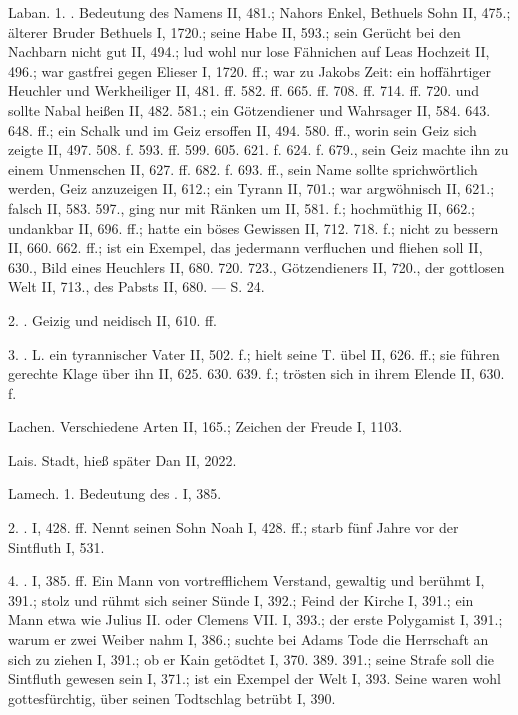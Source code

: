 Laban. 1. . Bedeutung des Namens II, 481.; Nahors Enkel, Bethuels Sohn II, 475.; älterer Bruder Bethuels I, 1720.; seine Habe II, 593.; sein Gerücht bei den Nachbarn nicht gut II, 494.; lud wohl nur lose Fähnichen auf Leas Hochzeit II, 496.; war gastfrei gegen Elieser I, 1720. ff.; war zu Jakobs Zeit: ein hoffährtiger Heuchler und Werkheiliger II, 481. ff. 582. ff. 665. ff. 708. ff. 714. ff. 720. und sollte Nabal heißen II, 482. 581.; ein Götzendiener und Wahrsager II, 584. 643. 648. ff.; ein Schalk und im Geiz ersoffen II, 494. 580. ff., worin sein Geiz sich zeigte II, 497. 508. f. 593. ff. 599. 605. 621. f. 624. f. 679., sein Geiz machte ihn zu einem Unmenschen II, 627. ff. 682. f. 693. ff., sein Name sollte sprichwörtlich werden, Geiz anzuzeigen II, 612.; ein Tyrann II, 701.; war argwöhnisch II, 621.; falsch II, 583. 597., ging nur mit Ränken um II, 581. f.; hochmüthig II, 662.; undankbar II, 696. ff.; hatte ein böses Gewissen II, 712. 718. f.; nicht zu bessern II, 660. 662. ff.; ist ein Exempel, das jedermann verfluchen und fliehen soll II, 630., Bild eines Heuchlers II, 680. 720. 723., Götzendieners II, 720., der gottlosen Welt II, 713., des Pabsts II, 680. — S.  24.

2. . Geizig und neidisch II, 610. ff.

3. . L. ein tyrannischer Vater II, 502. f.; hielt seine T. übel II, 626. ff.; sie führen gerechte Klage über ihn II, 625. 630. 639. f.; trösten sich in ihrem Elende II, 630. f.

Lachen. Verschiedene Arten II, 165.; Zeichen der Freude I, 1103.

Lais. Stadt, hieß später Dan II, 2022.

Lamech. 1. Bedeutung des . I, 385.

2. . I, 428. ff. Nennt seinen Sohn Noah I, 428. ff.; starb fünf Jahre vor der Sintfluth I, 531.

4. . I, 385. ff. Ein Mann von vortrefflichem Verstand, gewaltig und berühmt I, 391.; stolz und rühmt sich seiner Sünde I, 392.; Feind der Kirche I, 391.; ein Mann etwa wie Julius II. oder Clemens VII. I, 393.; der erste Polygamist I, 391.; warum er zwei Weiber nahm I, 386.; suchte bei Adams Tode die Herrschaft an sich zu ziehen I, 391.; ob er Kain getödtet I, 370. 389. 391.; seine Strafe soll die Sintfluth gewesen sein I, 371.; ist ein Exempel der Welt I, 393. Seine  waren wohl gottesfürchtig, über seinen Todtschlag betrübt I, 390.

